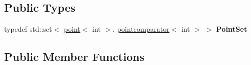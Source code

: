 \subsection*{Public Types}
\begin{DoxyCompactItemize}
\item 
\mbox{\label{classGMapping_1_1HierarchicalArray2D_a7d0dc555a718be704efb07072143ad24}} 
typedef std\+::set$<$ \hyperlink{structGMapping_1_1point}{point}$<$ int $>$, \hyperlink{structGMapping_1_1pointcomparator}{pointcomparator}$<$ int $>$ $>$ {\bfseries Point\+Set}
\end{DoxyCompactItemize}
\subsection*{Public Member Functions}
